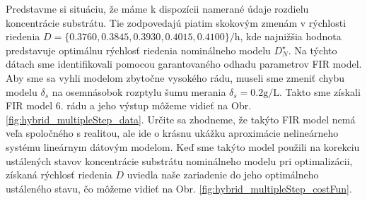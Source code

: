 Predstavme si situáciu, že máme k dispozícii namerané údaje rozdielu koncentrácie substrátu. Tie zodpovedajú piatim skokovým zmenám v rýchlosti riedenia $ D = \lbrace 0.3760, 0.3845, 0.3930, 0.4015, 0.4100 \rbrace \si{\per\hour} $, kde najnižšia hodnota predstavuje optimálnu rýchlosť riedenia nominálneho modelu $ D_{N}^{\star} $. Na týchto dátach sme identifikovali pomocou garantovaného odhadu parametrov FIR model. Aby sme sa vyhli modelom zbytočne vysokého rádu, museli sme zmeniť chybu modelu $ \delta_{s} $ na osemnásobok rozptylu šumu merania $ \delta_{s} = 0.2\si{\gram\per\liter} $. Takto sme získali FIR model 6. rádu a jeho výstup môžeme vidieť na Obr. \ref{fig:hybrid_multipleStep_data}. Určite sa zhodneme, že takýto FIR model nemá veľa spoločného s realitou, ale ide o krásnu ukážku aproximácie nelineárneho systému lineárnym dátovým modelom. Keď sme takýto model použili na korekciu ustálených stavov koncentrácie substrátu nominálneho modelu pri optimalizácii, získaná rýchlosť riedenia $ D $ uviedla naše zariadenie do jeho optimálneho ustáleného stavu, čo môžeme vidieť na Obr. \ref{fig:hybrid_multipleStep_costFun}. 

